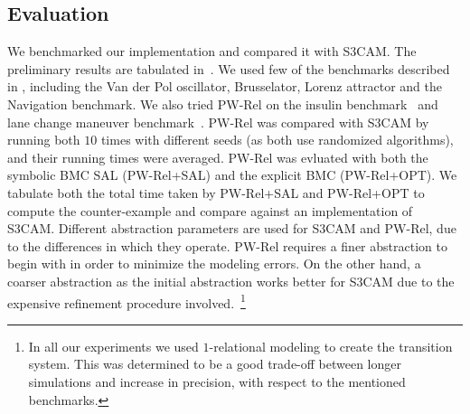 

\subsection{Evaluation}

We benchmarked our implementation and compared it with S3CAM.  The
preliminary results are tabulated in~. We used few of
the benchmarks described in \cite{zutshi2014multiple}, including the
Van der Pol oscillator, Brusselator, Lorenz attractor and the
Navigation benchmark. We also tried PW-Rel on the insulin
benchmark~\cite{chenformal} and lane change maneuver
benchmark~\cite{althoff2012reachability}. PW-Rel was compared with
S3CAM by running both $10$ times with different seeds (as both use
randomized algorithms), and their running times were averaged. PW-Rel
was evluated with both the symbolic BMC SAL (PW-Rel+SAL) and the
explicit BMC (PW-Rel+OPT). %
We
tabulate both the total time taken by PW-Rel+SAL and PW-Rel+OPT to
compute the counter-example and compare against an implementation of
S3CAM.  Different abstraction parameters are used for S3CAM and
PW-Rel, due to the differences in which they operate. PW-Rel
requires a finer abstraction to begin with in order to minimize the
modeling errors. On the other hand, a coarser abstraction as the
initial abstraction works better for S3CAM due to the expensive
refinement procedure involved.~\footnote{In all our experiments we
used $1$-relational modeling to create the transition system.
This was determined to be a good trade-off between longer simulations
and increase in precision, with respect to the mentioned benchmarks.}

